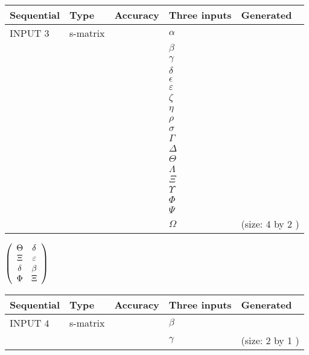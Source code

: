\documentclass[12pt]{article}
\begin{document}
  
\noindent\begin{tabular}{|l|l|l|l|l|}
\hline
 Sequential & Type & Accuracy & Three inputs & Generated \\ 
\hline
 
 
  INPUT $            3 $ & s-matrix & & 
 $  \alpha $ & 
  \\
  & & & 
 $  \beta $ & 
  \\
  & & & 
 $  \gamma $ & 
  \\
  & & & 
 $  \delta $ & 
  \\
  & & & 
 $  \epsilon $ & 
  \\
  & & & 
 $  \varepsilon $ & 
  \\
  & & & 
 $                     \zeta $ & 
  \\
  & & & 
 $  \eta $ & 
  \\
  & & & 
 $  \rho $ & 
  \\
  & & & 
 $  \sigma $ & 
  \\
  & & & 
 $  \Gamma $ & 
  \\
  & & & 
 $  \Delta $ & 
  \\
  & & & 
 $  \Theta $ & 
  \\
  & & & 
 $  \Lambda $ & 
  \\
  & & & 
 $                     \Xi $ & 
  \\
  & & & 
 $  \Upsilon $ & 
  \\
  & & & 
 $  \Phi $ & 
  \\
  & & & 
 $  \Psi $ & 
  \\
  & & & 
 $  \Omega $ & 
  (size:            4  by            2 )
 \\  \hline  
 \end{tabular}
   
   
 $  \left( \begin{array}
 {
 c
 c
 }
 \Theta & 
 \delta \\ 
                    \Xi & 
 \varepsilon \\ 
 \delta & 
 \beta \\ 
 \Phi & 
                    \Xi
 \end{array} \right) $ 
  
  
\noindent\begin{tabular}{|l|l|l|l|l|}
\hline
 Sequential & Type & Accuracy & Three inputs & Generated \\ 
\hline
 
 
  INPUT $            4 $ & s-matrix & & 
 $  \beta $ & 
  \\
  & & & 
 $  \gamma $ & 
  (size:            2  by            1 )
 \\  \hline  
 \end{tabular}
   
\end{document}
